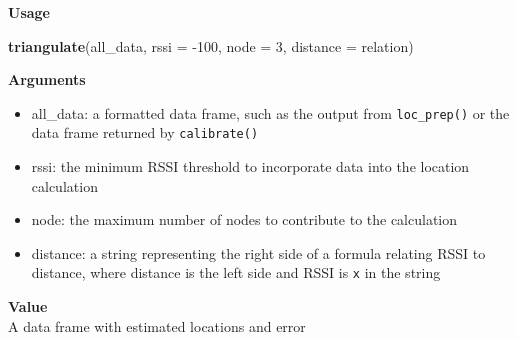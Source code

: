 \documentclass[
]{book}
\newenvironment{Shaded}{\begin{snugshade}}{\end{snugshade}}
\newcommand{\DataTypeTok}[1]{\textcolor[rgb]{0.13,0.29,0.53}{#1}}
\newcommand{\DecValTok}[1]{\textcolor[rgb]{0.00,0.00,0.81}{#1}}
\newcommand{\KeywordTok}[1]{\textcolor[rgb]{0.13,0.29,0.53}{\textbf{#1}}}
\newcommand{\NormalTok}[1]{#1}
\providecommand{\tightlist}{%
  \setlength{\itemsep}{0pt}\setlength{\parskip}{0pt}}
\begin{document}
\textbf{Usage}

\begin{Shaded}
\begin{Highlighting}[]
\KeywordTok{triangulate}\NormalTok{(all_data, }\DataTypeTok{rssi =} \DecValTok{-100}\NormalTok{, }\DataTypeTok{node =} \DecValTok{3}\NormalTok{, }\DataTypeTok{distance =}\NormalTok{ relation)}
\end{Highlighting}
\end{Shaded}

\textbf{Arguments}

\begin{itemize}
\tightlist
\item
  all\_data: a formatted data frame, such as the output from \texttt{loc\_prep()} or the data frame returned by \texttt{calibrate()}\\
\item
  rssi: the minimum RSSI threshold to incorporate data into the location calculation\\
\item
  node: the maximum number of nodes to contribute to the calculation\\
\item
  distance: a string representing the right side of a formula relating RSSI to distance, where distance is the left side and RSSI is \texttt{x} in the string
\end{itemize}

\textbf{Value}\\
A data frame with estimated locations and error
\end{document}
